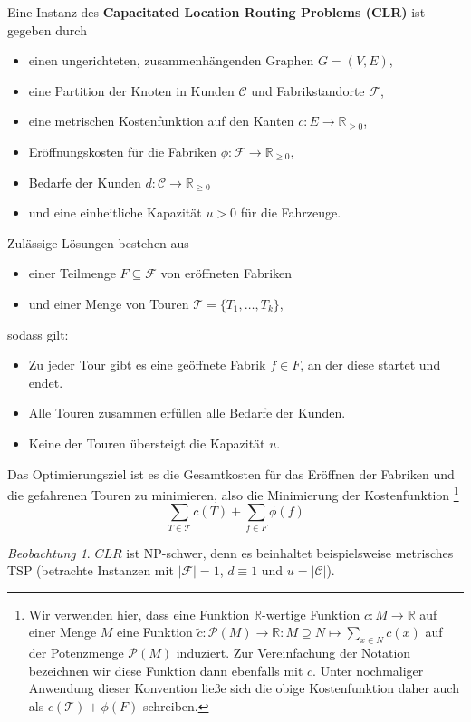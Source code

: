 \documentclass[a4paper,ngerman,11pt,bibtotoc]{scrartcl}
\theoremstyle{definition}
\theoremstyle{plain}
\theoremstyle{remark}
\newtheorem{beob}[defn]{Beobachtung}
\newcommand{\IR}{\mathbb{R}}
\newcommand{\Tc}{\mathcal{T}}
\newcommand{\ClientSet}{\mathscr{C}}
\newcommand{\FacilitySet}{\mathscr{F}}
\newcommand{\CLR}{CLR}
\begin{document}
Eine Instanz des \textbf{Capacitated Location Routing Problems (\CLR)} ist gegeben durch
\begin{itemize}
	\item einen ungerichteten, zusammenhängenden Graphen $G =(V,E)$,
	\item eine Partition der Knoten in Kunden $\ClientSet$ und Fabrikstandorte $\FacilitySet$,
	\item eine metrischen Kostenfunktion auf den Kanten $c: E \to \IR_{\geq 0}$,
	\item Eröffnungskosten für die Fabriken $\phi: \FacilitySet \to \IR_{\geq 0}$,
	\item Bedarfe der Kunden $d: \ClientSet \to \IR_{\geq 0}$
	\item und eine einheitliche Kapazität $u > 0$ für die Fahrzeuge.		
\end{itemize}
Zulässige Lösungen bestehen aus
\begin{itemize}
	\item einer Teilmenge $F \subseteq \FacilitySet$ von eröffneten Fabriken
	\item und einer Menge von Touren $\Tc = \{T_1, \dots, T_k\}$,
\end{itemize}
sodass gilt:
\begin{itemize}
	\item Zu jeder Tour gibt es eine geöffnete Fabrik $f \in F$, an der diese startet und endet.
	\item Alle Touren zusammen erfüllen alle Bedarfe der Kunden.
	\item Keine der Touren übersteigt die Kapazität $u$.
\end{itemize}
Das Optimierungsziel ist es die Gesamtkosten für das Eröffnen der Fabriken und die gefahrenen Touren zu minimieren, also die Minimierung der Kostenfunktion
\footnote{Wir verwenden hier, dass eine Funktion $\IR$-wertige Funktion $c: M \to \IR$ auf einer Menge $M$ eine Funktion $\tilde{c}: \mathcal{P}(M) \to \IR: M \supseteq N \mapsto \sum_{x \in N} c(x)$ auf der Potenzmenge $\mathcal{P}(M)$ induziert. Zur Vereinfachung der Notation bezeichnen wir diese Funktion dann ebenfalls mit $c$. Unter nochmaliger Anwendung dieser Konvention ließe sich die obige Kostenfunktion daher auch als $c(\Tc) + \phi(F)$ schreiben.}
	\[\sum_{T\in\Tc} c(T) + \sum_{f\in F}\phi(f) \]
	
\begin{beob}
	$\CLR{}$ ist NP-schwer, denn es beinhaltet beispielsweise metrisches TSP (betrachte Instanzen mit $|\FacilitySet| = 1$, $d \equiv 1$ und $u = |\ClientSet|$).
\end{beob}
\end{document}

